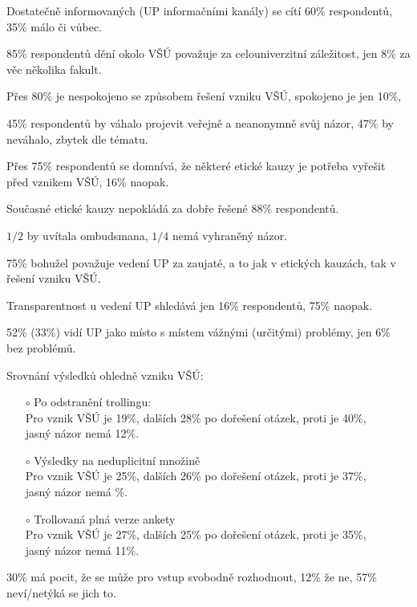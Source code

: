 \documentclass[a4paper,twoside]{article}
\begin{document}
\begin{itemize}
  \item Dostatečně informovaných (UP informačními kanály) se cítí 60\% respondentů, 35\% málo či vůbec.
  \item 85\% respondentů  dění okolo VŠÚ považuje za celouniverzitní záležitost, jen 8\% za věc několika fakult.
  \item Přes 80\% je nespokojeno se způsobem řešení vzniku VŠÚ, spokojeno je jen 10\%, 
  \item 45\% respondentů by váhalo projevit veřejně a neanonymně svůj názor, 47\% by neváhalo, zbytek dle tématu.
  \item Přes 75\% respondentů se domnívá, že některé etické kauzy je potřeba vyřešit před vznikem VŠÚ, 16\% naopak.
  \item Současné etické kauzy nepokládá za dobře řešené 88\% respondentů.
  \item $1/2$ by uvítala ombudsmana, $1/4$ nemá vyhraněný názor.
  \item 75\% bohužel považuje vedení UP za zaujaté, a to jak v etických kauzách, tak v řešení vzniku VŠÚ.
  \item Transparentnost u vedení UP shledává jen 16\% respondentů, 75\% naopak.
  \item 52\% (33\%) vidí UP jako místo s místem vážnými (určitými) problémy, jen 6\% bez problémů.
{\bf 
  \item Srovnání výsledků ohledně vzniku VŠÚ:
    \begin{itemize} 
      \item[$\circ$] Po odstranění trollingu:
      \\ Pro vznik VŠÚ je 19\%, dalších 28\% po dořešení otázek, proti je 40\%, \\ jasný názor nemá 12\%.
      \item[$\circ$] Výsledky na neduplicitní množině
      \\ Pro vznik VŠÚ je 25\%, dalších 26\% po dořešení otázek, proti je 37\%, \\ jasný názor nemá \%.
      \item[$\circ$] Trollovaná plná verze ankety
      \\ Pro vznik VŠÚ je 27\%, dalších 25\% po dořešení otázek, proti je 35\%, \\ jasný názor nemá 11\%.
    \end{itemize}
}
  \item 30\% má pocit, že se může pro vstup svobodně rozhodnout, 12\% že ne, 57\% neví/netýká se jich to.

\end{itemize}
\end{document}
